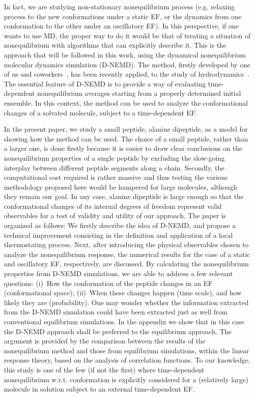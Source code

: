 \documentclass[journal=jctcce,manuscript=manuscript]{achemso}
\begin{document}
In fact, we are studying non-stationary nonequilibrium process
(e.g. relaxing process to the new conformations under a static
EF, or the dynamics from one conformation to the other under an oscillatory EF).
In this perspective, if one wants to use MD, the proper way to do it would be that of treating a situation of nonequilibrium with algorithms that can explicitly describe it.
This is the approach that will be followed in this work, using
the dynamical nonequilibrium molecular dynamics simulation (D-NEMD).
The method, firstly developed by one of us and coworkers~\cite{ciccotti1975direct, ciccotti1979thought, ciccotti1993theoretical, palla2008bulk}, 
has been recently applied, to the study of
hydrodynamics~\cite{orlandini2011hydrodynamics,
  orlandini2011hydrodynamics-01}. The essential feature of D-NEMD is to
provide a way of evaluating time-dependent
nonequilibrium averages starting from a properly determined initial ensemble.
In this context, the method can be used to analyze the
conformational changes of a solvated molecule, subject to a time-dependent EF.

In the present paper, we study a small peptide, alanine dipeptide, as a model for showing how the method can be used. 
The choice of a small peptide, rather than a larger one, is done firstly because it
is easier to draw clear conclusions on the nonequilibrium properties
of a single peptide by excluding the slow-going interplay between
different peptide segments along a chain. 
Secondly, the computational cost required is rather massive and thus  testing
the various methodology proposed here would be hampered for large molecules,
although they remain our goal.  In any case, alanine dipeptide
is large enough so that the conformational changes of its internal degrees of freedom represent valid observables for a test of validity and utility of our approach.
The paper is organized as follows:
  We firstly describe the idea of D-NEMD, and propose a technical improvement consisting in the definition and application of a local thermostating process.
Next, after introducing the physical
observables chosen to analyze the nonequilibrium response,
the numerical results for the case of a static and oscillatory EF, respectively, are discussed. By calculating the nonequilibrium properties from D-NEMD
simulations, we are able to address
a few relevant questions: (i)~How the conformation of the peptide
changes in an EF (conformational space);
(ii)~When these changes happen (time scale),
and how likely they are (probability).
{One may wonder whether the information extracted from the D-NEMD simulation could have been
extracted just as well from conventional equilibrium simulations.
  In the appendix we show that in this case the D-NEMD approach shall be preferred to the equilibrium approach. The argument is provided by the comparison between the results of the nonequilibrium method and
  those from equilibrium simulations, within the linear response theory, based on the analysis of correlation functions.}
To our knowledge, this study is one of the few (if not the first)  where
time-dependent nonequilibrium w.r.t. conformation
is explicitly considered for a (relatively large) molecule
in solution subject to an external time-dependent EF.
\end{document}
